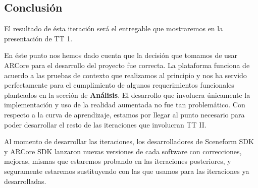 \subsection{Conclusión}
El resultado de ésta iteración será el entregable que mostraremos en la presentación de TT 1. \par
En éste punto nos hemos dado cuenta que la decisión que tomamos de usar ARCore para el desarrollo del proyecto fue correcta. La plataforma funciona de acuerdo a las pruebas de contexto que realizamos al principio y nos ha servido perfectamente para el cumplimiento de algunos requerimientos funcionales planteados en la sección de \textbf{Análisis}. El desarrollo que involucra únicamente la implementación y uso de la realidad aumentada no fue tan problemático. Con respecto a la curva de aprendizaje, estamos por llegar al punto necesario para poder desarrollar el resto de las iteraciones que involucran TT II. \par Al momento de desarrollar las iteraciones, los desarrolladores de Sceneform SDK y ARCore SDK lanzaron nuevas versiones de cada software con correcciones, mejoras, mismas que estaremos probando en las iteraciones posteriores, y seguramente estaremos sustituyendo con las que usamos para las iteraciones ya desarrolladas. 